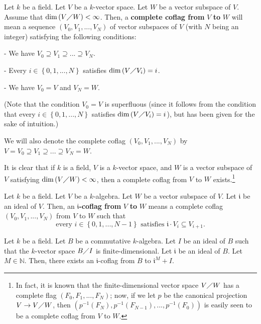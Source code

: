 \documentclass[etingof-lie.tex]{subfiles}
\begin{document}
\begin{definition}
Let $k$ be a field. Let $V$ be a $k$-vector space. Let $W$ be a vector
subspace of $V$. Assume that $\dim\left(  V\diagup W\right)  <\infty$. Then, a
\textbf{complete coflag from }$V$ \textbf{to }$W$ will mean a sequence
$\left(  V_{0},V_{1},...,V_{N}\right)  $ of vector subspaces of $V$ (with $N$
being an integer) satisfying the following conditions:

- We have $V_{0}\supseteq V_{1}\supseteq...\supseteq V_{N}$.

- Every $i\in\left\{  0,1,...,N\right\}  $ satisfies $\dim\left(  V\diagup
V_{i}\right)  =i$.

- We have $V_{0}=V$ and $V_{N}=W$.

(Note that the condition $V_{0}=V$ is superfluous (since it follows from the
condition that every $i\in\left\{  0,1,...,N\right\}  $ satisfies $\dim\left(
V\diagup V_{i}\right)  =i$), but has been given for the sake of intuition.)

We will also denote the complete coflag $\left(  V_{0},V_{1},...,V_{N}\right)
$ by $V=V_{0}\supseteq V_{1}\supseteq...\supseteq V_{N}=W$.
\end{definition}

It is clear that if $k$ is a field, $V$ is a $k$-vector space, and $W$ is a
vector subspace of $V$ satisfying $\dim\left(  V\diagup W\right)  <\infty$,
then a complete coflag from $V$ to $W$ exists.\footnote{In fact, it is known
that the finite-dimensional vector space $V\diagup W$ has a complete flag
$\left(  F_{0},F_{1},...,F_{N}\right)  $; now, if we let $p$ be the canonical
projection $V\rightarrow V\diagup W$, then $\left(  p^{-1}\left(
F_{N}\right)  ,p^{-1}\left(  F_{N-1}\right)  ,...,p^{-1}\left(  F_{0}\right)
\right)  $ is easily seen to be a complete coflag from $V$ to $W$.}

\begin{definition}
Let $k$ be a field. Let $V$ be a $k$-algebra. Let $W$ be a vector subspace of
$V$. Let $\mathfrak{i}$ be an ideal of $V$. Then, an $\mathfrak{i}%
$\textbf{-coflag from }$V$\textbf{ to }$W$ means a complete coflag $\left(
V_{0},V_{1},...,V_{N}\right)  $ from $V$ to $W$ such that
\[
\text{every }i\in\left\{  0,1,...,N-1\right\}  \text{ satisfies }%
\mathfrak{i}\cdot V_{i}\subseteq V_{i+1}.
\]

\end{definition}

\begin{lemma}
\label{lem.V=F(X)U.coflags}Let $k$ be a field. Let $B$ be a commutative
$k$-algebra. Let $I$ be an ideal of $B$ such that the $k$-vector space
$B\diagup I$ is finite-dimensional. Let $\mathfrak{i}$ be an ideal of $B$. Let
$M\in\mathbb{N}$. Then, there exists an $\mathfrak{i}$-coflag from $B$ to
$\mathfrak{i}^{M}+I$.
\end{lemma}
\end{document}
